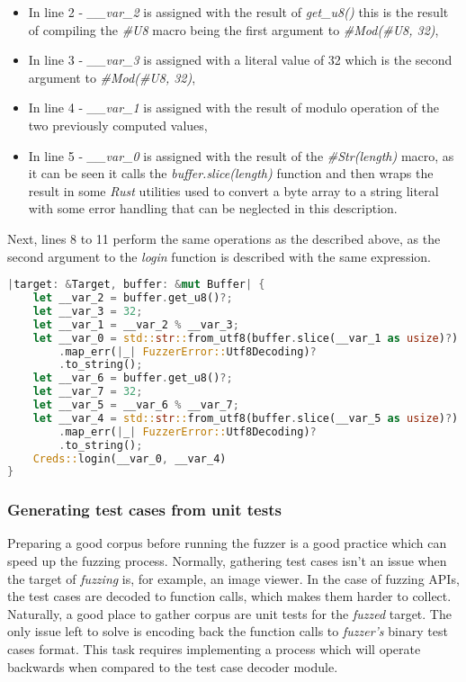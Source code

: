 \begin{itemize}
    \item In line 2 - \textit{\_\_var\_2} is assigned with the result of \textit{get\_u8()} this is the result of compiling the \textit{\#U8} macro being the first argument to \textit{\#Mod(\#U8, 32)},
    \item In line 3 - \textit{\_\_var\_3} is assigned with a literal value of 32 which is the second argument to \textit{\#Mod(\#U8, 32)},
    \item In line 4 - \textit{\_\_var\_1} is assigned with the result of modulo operation of the two previously computed values,
    \item In line 5 - \textit{\_\_var\_0} is assigned with the result of the \textit{\#Str(length)} macro, as it can be seen it calls the \textit{buffer.slice(length)} function and then wraps the result in some \textit{Rust} utilities used to convert a byte array to a string literal with some error handling that can be neglected in this description.
\end{itemize}
Next, lines 8 to 11 perform the same operations as the described above, as the second argument to the \textit{login} function is described with the same expression.

\begin{minipage}{\linewidth}
\begin{lstlisting}[language=rust,caption={Example of compiler output.},label={lst:compiler_out}]
|target: &Target, buffer: &mut Buffer| {
    let __var_2 = buffer.get_u8()?;
    let __var_3 = 32;
    let __var_1 = __var_2 % __var_3;
    let __var_0 = std::str::from_utf8(buffer.slice(__var_1 as usize)?)
        .map_err(|_| FuzzerError::Utf8Decoding)?
        .to_string();
    let __var_6 = buffer.get_u8()?;
    let __var_7 = 32;
    let __var_5 = __var_6 % __var_7;
    let __var_4 = std::str::from_utf8(buffer.slice(__var_5 as usize)?)
        .map_err(|_| FuzzerError::Utf8Decoding)?
        .to_string();
    Creds::login(__var_0, __var_4)
}
\end{lstlisting} 
\end{minipage}

\subsubsection{Generating test cases from unit tests} \label{sec:testint}
Preparing a good corpus before running the fuzzer is a good practice which can speed up the fuzzing process. Normally, gathering test cases isn't an issue when the target of \textit{fuzzing} is, for example, an image viewer. In the case of fuzzing APIs, the test cases are decoded to function calls, which makes them harder to collect. Naturally, a good place to gather corpus are unit tests for the \textit{fuzzed} target. The only issue left to solve is encoding back the function calls to \textit{fuzzer's} binary test cases format. This task requires implementing a process which will operate backwards when compared to the test case decoder module.

